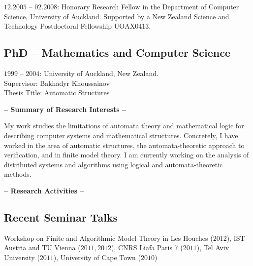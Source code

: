 \documentclass[a4paper]{article}
\def\tit#1{\medskip \begin{center}  {\Large {\bf -- #1 -- }} \end{center}}
\newif\ifcut
\begin{document}
{$12.2005$ -- $02.2008$: Honorary Research Fellow in the Department of Computer
Science, University of Auckland. Supported by a New Zealand Science and Technology Postdoctoral
Fellowship $\textrm{UOAX}0413$.}

\subsection*{{PhD -- Mathematics and Computer Science}}
{$1999$ -- $2004$: University of Auckland, New Zealand.\\
Supervisor: Bakhadyr Khoussainov\\
Thesis Title: Automatic Structures}

\ifcut
\subsection*{{MSc -- Mathematics (first class)}}
{$1997$ -- $1998$: University of Auckland, New Zealand.}

\subsection*{BSc -- Mathematics and Computer Science}
{$1994$ -- $1996$: University of Cape Town, South Africa.} 
\fi

\tit{Summary of Research Interests}

My work studies the limitations of automata theory and mathematical logic for describing
computer systems and mathematical structures. Concretely, I have worked in the
area of automatic structures, the automata-theoretic approach to verification, and in finite model
theory. I am currently working on the analysis of distributed systems and algorithms using logical and automata-theoretic methods.

\tit{Research Activities}

\subsection*{Recent Seminar Talks} Workshop on Finite and Algorithmic Model Theory in Les Houches ($2012$), IST Austria and TU Vienna ($2011,2012$), CNRS Liafa Paris 7 ($2011$), Tel Aviv University ($2011$), University of Cape Town ($2010$) \\
\end{document}
